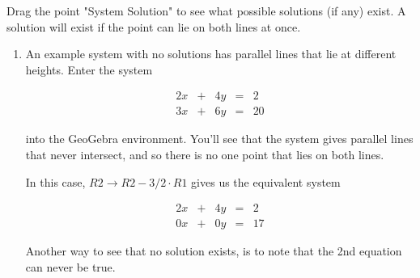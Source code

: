 \documentclass{ximera}
\begin{document}
\begin{exploration}
\begin{example}
        \begin{hint}
    
            Drag the point "System Solution" to see what possible solutions (if any) exist. A solution will exist if the point can lie on both lines at once.
    
        \end{hint}
    
        \begin{selectAll}
        \end{selectAll}
    
        \begin{solution}
    
            \begin{enumerate}
    
                \item An example system with no solutions has parallel lines that lie at different heights. Enter the system
    
                    $$\begin{array}{ccccc}
                            2x & +&4y&=&2 \\
                            3x& +&6y&=&20
                        \end{array}$$
    
                    into the GeoGebra environment. You'll see that the system gives parallel lines that never intersect, and so there is no one point that lies on both lines. 
    
                    In this case, $R2\rightarrow R2-3/2\cdot R1$ gives us the equivalent system
    
                    $$\begin{array}{ccccc}
                            2x & +&4y&=&2 \\
                            0x& +&0y&=&17
                        \end{array}$$
    
                    Another way to see that no solution exists, is to note that the 2nd equation can never be true.
    

\end{enumerate}
\end{solution}
\end{example}
\end{exploration}
\end{document}
